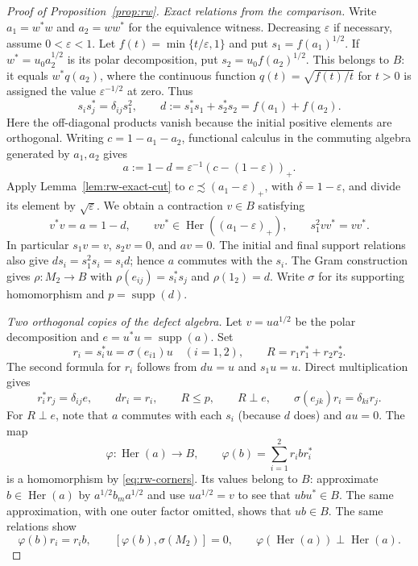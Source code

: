 \begin{proof}[Proof of Proposition~\ref{prop:rw}]
\emph{Exact relations from the comparison.}
Write $a_1=w^*w$ and $a_2=ww^*$ for the equivalence witness.
Decreasing $\varepsilon$ if necessary, assume $0<\varepsilon<1$.
Let $f(t)=\min\{t/\varepsilon,1\}$ and put
$s_1=f(a_1)^{1/2}$. If $w^*=u_0a_2^{1/2}$ is its polar
decomposition, put $s_2=u_0f(a_2)^{1/2}$. This belongs to $B$:
it equals $w^*q(a_2)$, where the continuous function
$q(t)=\sqrt{f(t)/t}$ for $t>0$ is assigned the value
$\varepsilon^{-1/2}$ at zero. Thus
\[
 s_i s_j^*=\delta_{ij}s_1^2,\qquad
 d:=s_1^*s_1+s_2^*s_2=f(a_1)+f(a_2).
\]
Here the off-diagonal products vanish because the initial positive
elements are orthogonal. Writing $c=1-a_1-a_2$, functional calculus
in the commuting algebra generated by $a_1,a_2$ gives
\[
 a:=1-d=\varepsilon^{-1}(c-(1-\varepsilon))_+.
\]
Apply Lemma~\ref{lem:rw-exact-cut} to $c\precsim(a_1-\varepsilon)_+$,
with $\delta=1-\varepsilon$, and divide its element by
$\sqrt\varepsilon$. We obtain a contraction $v\in B$ satisfying
\begin{equation}\label{eq:rw-relations}
 v^*v=a=1-d,\qquad vv^*\in\operatorname{Her}((a_1-\varepsilon)_+),
 \qquad s_1^2vv^*=vv^*.
\end{equation}
In particular $s_1v=v$, $s_2v=0$, and $av=0$.
The initial and final support relations also give
$ds_i=s_1^2s_i=s_id$; hence $a$ commutes with the $s_i$.
The Gram construction gives $\rho:M_2\to B$ with
$\rho(e_{ij})=s_i^*s_j$ and $\rho(1_2)=d$.
Write $\sigma$ for its supporting homomorphism and
$p=\operatorname{supp}(d)$.

\emph{Two orthogonal copies of the defect algebra.}
Let $v=ua^{1/2}$ be the polar decomposition and
$e=u^*u=\operatorname{supp}(a)$. Set
\[
 r_i=s_i^*u=\sigma(e_{i1})u\quad(i=1,2),
 \qquad R=r_1r_1^*+r_2r_2^*.
\]
The second formula for $r_i$ follows from $du=u$ and $s_1u=u$.
Direct multiplication gives
\begin{equation}\label{eq:rw-corners}
 r_i^*r_j=\delta_{ij}e,\qquad
 dr_i=r_i,\qquad R\le p,\qquad R\perp e,\qquad
 \sigma(e_{jk})r_i=\delta_{ki}r_j.
\end{equation}
For $R\perp e$, note that $a$ commutes with each $s_i$ (because
$d$ does) and $au=0$. The map
\[
 \varphi:\operatorname{Her}(a)\longrightarrow B,
 \qquad \varphi(b)=\sum_{i=1}^2 r_i b r_i^*
\]
is a homomorphism by \eqref{eq:rw-corners}. Its values belong to
$B$: approximate $b\in\operatorname{Her}(a)$ by
$a^{1/2}b_m a^{1/2}$ and use $ua^{1/2}=v$ to see that
$ubu^*\in B$. The same approximation, with one outer factor omitted,
shows that $ub\in B$.
The same relations show
\begin{equation}\label{eq:rw-phi}
 \varphi(b)r_i=r_i b,\qquad
 [\varphi(b),\sigma(M_2)]=0,\qquad
 \varphi(\operatorname{Her}(a))\perp\operatorname{Her}(a).
\end{equation}


\end{proof}
